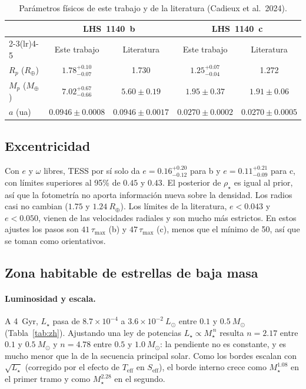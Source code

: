\documentclass[twocolumn,aps,pra,11pt]{revtex4-2}
\newcommand{\Msun}{\ensuremath{M_\odot}}
\newcommand{\Lsun}{\ensuremath{L_\odot}}
\newcommand{\Mearth}{\ensuremath{M_\oplus}}
\newcommand{\Rearth}{\ensuremath{R_\oplus}}
\begin{document}
\begin{table}[!t]
\centering\small
\caption{Parámetros físicos de este trabajo y de la literatura (Cadieux et al.\ 2024).}\label{tab:fis}
\begin{tabular}{lcccc}
\toprule
 & \multicolumn{2}{c}{LHS~1140~b} & \multicolumn{2}{c}{LHS~1140~c}\\
\cmidrule(lr){2-3}\cmidrule(lr){4-5}
 & Este trabajo & Literatura & Este trabajo & Literatura\\
\midrule
$R_p$ (\Rearth) & $1.78^{+0.10}_{-0.07}$ & 1.730 & $1.25^{+0.07}_{-0.04}$ & 1.272\\[2pt]
$M_p$ (\Mearth) & $7.02^{+0.67}_{-0.66}$ & $5.60 \pm 0.19$ & $1.95 \pm 0.37$ & $1.91 \pm 0.06$\\[2pt]
$a$ (ua) & $0.0946 \pm 0.0008$ & $0.0946 \pm 0.0017$ & $0.0270 \pm 0.0002$ & $0.0270 \pm 0.0005$\\
\bottomrule
\end{tabular}
\end{table}

\subsection{Excentricidad}

Con $e$ y $\omega$ libres, TESS por sí solo da $e = 0.16^{+0.20}_{-0.12}$ para b y $e = 0.11^{+0.21}_{-0.09}$ para c, con límites superiores al 95\% de $0.45$ y $0.43$. El posterior de $\rho_\star$ es igual al prior, así que la fotometría no aporta información nueva sobre la densidad. Los radios casi no cambian ($1.75$ y $1.24~\Rearth$). Los límites de la literatura, $e < 0.043$ y $e < 0.050$, vienen de las velocidades radiales y son mucho más estrictos. En estos ajustes los pasos son $41\,\tau_\mathrm{max}$ (b) y $47\,\tau_\mathrm{max}$ (c), menos que el mínimo de 50, así que se toman como orientativos.

\subsection{Zona habitable de estrellas de baja masa}\label{sec:zh}

\paragraph{Luminosidad y escala.} A 4~Gyr, $L_\star$ pasa de $8.7\times10^{-4}$ a $3.6\times10^{-2}~\Lsun$ entre $0.1$ y $0.5~\Msun$ (Tabla~\ref{tab:zh}). Ajustando una ley de potencias $L_\star \propto M_\star^{\,n}$ resulta $n = 2.17$ entre $0.1$ y $0.5~\Msun$ y $n = 4.78$ entre $0.5$ y $1.0~\Msun$: la pendiente no es constante, y es mucho menor que la de la secuencia principal solar. Como los bordes escalan con $\sqrt{L_\star}$ (corregido por el efecto de $T_\mathrm{eff}$ en $S_\mathrm{eff}$), el borde interno crece como $M_\star^{1.08}$ en el primer tramo y como $M_\star^{2.28}$ en el segundo.
\end{document}
